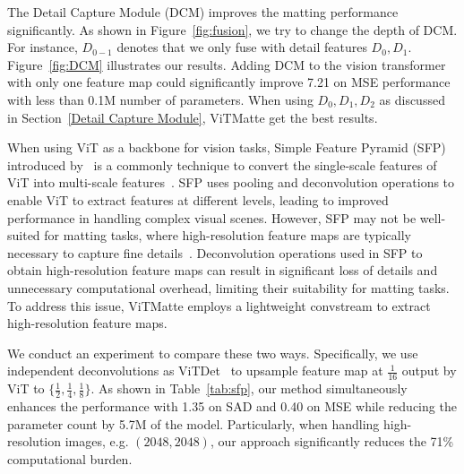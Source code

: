 \documentclass[10pt,twocolumn,letterpaper]{article}
\newcommand{\thename}{ViTMatte}
\begin{document}
The Detail Capture Module (DCM) improves the matting performance significantly. As shown in Figure~\ref{fig:fusion}, we try to change the depth of DCM. For instance, $D_{0-1}$ denotes that we only fuse with detail features $D_0, D_1$. Figure~\ref{fig:DCM} illustrates our results. Adding DCM to the vision transformer with only one feature map could significantly improve 7.21 on MSE performance with less than 0.1M number of parameters. When using $D_0, D_1, D_2$ as discussed in Section~\ref{Detail Capture Module}, \thename{} get the best results.

When using ViT as a backbone for vision tasks,  Simple Feature Pyramid (SFP) introduced by~\cite{vitdet} is a commonly technique to convert the single-scale features of ViT into multi-scale features~\cite{he2022masked, EVA, EVA02}. SFP uses pooling and deconvolution operations to enable ViT to extract features at different levels,  leading to improved performance in handling complex visual scenes. However, SFP may not be well-suited for matting tasks, where high-resolution feature maps are typically necessary to capture fine details~\cite{rmat}. Deconvolution operations used in SFP to obtain high-resolution feature maps can result in significant loss of details and unnecessary computational overhead, limiting their suitability for matting tasks. To address this issue, \thename{} employs a lightweight convstream to extract high-resolution feature maps.

We conduct an experiment to compare these two ways. Specifically, we use independent deconvolutions as ViTDet~\cite{vitdet} to upsample feature map at $\frac{1}{16}$ output by ViT to $\{\frac{1}{2}, \frac{1}{4}, \frac{1}{8} \}$. As shown in Table~\ref{tab:sfp}, our method simultaneously enhances the performance with 1.35 on SAD and 0.40 on MSE while reducing the parameter count by 5.7M of the model. Particularly, when handling high-resolution images, e.g. $(2048, 2048)$, our approach significantly reduces the 71\% computational burden.
\end{document}
